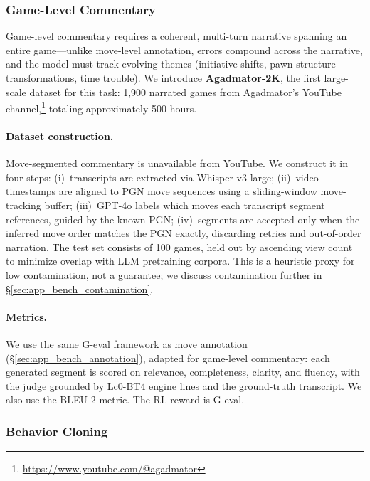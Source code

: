 \subsubsection{Game-Level Commentary}
\label{sec:app_bench_commentary}

Game-level commentary requires a coherent, multi-turn narrative spanning an entire game---unlike move-level annotation, errors compound across the narrative, and the model must track evolving themes (initiative shifts, pawn-structure transformations, time trouble). We introduce \textbf{Agadmator-2K}, the first large-scale dataset for this task: 1,900 narrated games from Agadmator's YouTube channel,\footnote{\url{https://www.youtube.com/@agadmator}} totaling approximately 500 hours.

\paragraph{Dataset construction.}
Move-segmented commentary is unavailable from YouTube. We construct it in four steps: (i)~transcripts are extracted via Whisper-v3-large; (ii)~video timestamps are aligned to PGN move sequences using a sliding-window move-tracking buffer; (iii)~GPT-4o labels which moves each transcript segment references, guided by the known PGN; (iv)~segments are accepted only when the inferred move order matches the PGN exactly, discarding retries and out-of-order narration. The test set consists of 100 games, held out by ascending view count to minimize overlap with LLM pretraining corpora. This is a heuristic proxy for low contamination, not a guarantee; we discuss contamination further in \S\ref{sec:app_bench_contamination}.

\paragraph{Metrics.}
We use the same G-eval framework as move annotation (\S\ref{sec:app_bench_annotation}), adapted for game-level commentary: each generated segment is scored on relevance, completeness, clarity, and fluency, with the judge grounded by Lc0-BT4 engine lines and the ground-truth transcript. We also use the BLEU-2 metric. The RL reward is G-eval.

\subsubsection{Behavior Cloning}
\label{sec:app_bench_bc}

